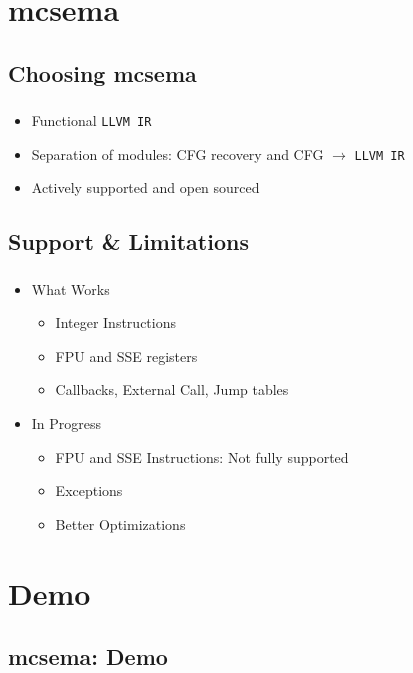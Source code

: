 \documentclass[mathserif,10pt]{beamer}
\newcommand{\LIR}{{\tt LLVM IR}}
\begin{document}
\section{mcsema}
  \subsection{Choosing mcsema}
  \frame
  {
    \frametitle{\subsecname}
    \begin{itemize}
      \item Functional \LIR
      \item Separation of modules: CFG recovery and CFG $\rightarrow$ \LIR
      \item Actively supported and open sourced
    \end{itemize}

    \begin{figure}[h]
      \centering
    \end{figure}
  }

  \subsection{Support \& Limitations}
  \frame
  {
    \frametitle{\subsecname}
    \begin{itemize}
      \item What Works
        \begin{itemize}
          \item Integer Instructions
          \item FPU and SSE registers
          \item Callbacks, External Call, Jump tables 
        \end{itemize}
      \item In Progress
        \begin{itemize}
          \item FPU and SSE Instructions: Not fully supported
          \item Exceptions
          \item Better Optimizations
        \end{itemize}
    \end{itemize}
  }

\section{Demo}
  \subsection{mcsema: Demo}
  \frame
  {
    \frametitle{\subsecname}
  }
\end{document}
